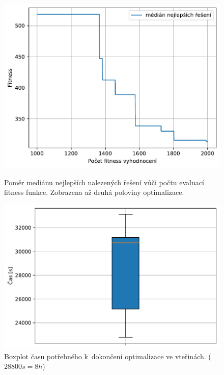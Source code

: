 \begin{figure}[H]
\begin{minipage}[t]{0.475\linewidth}
	\includegraphics[width=\textwidth]{obrazky-figures/statistics/HIFU/flower/15/SA/bestsToFitness_1.pdf}
	\caption{Poměr mediánu nejlepších nalezených řešení vůči počtu evaluací fitness funkce. Zobrazena až druhá poloviny optimalizace.}
	\label{fg:hifu:flower:sa:fitPerf}
\end{minipage}
\hfill
\begin{minipage}[t]{0.475\linewidth}
\includegraphics[width=\linewidth]{obrazky-figures/statistics/HIFU/flower/15/SA/timeBoxplot_WithOutliers.pdf}
\caption{Boxplot času potřebného k~dokončení optimalizace ve vteřinách. ($28800s = 8h$)}
\label{fg:hifu:flower:sa:time}
\end{minipage}
\end{figure}


